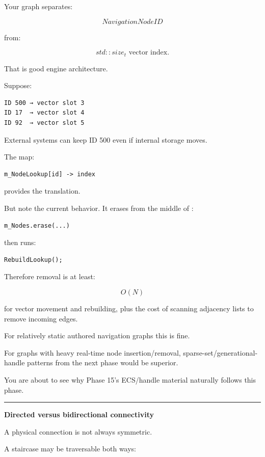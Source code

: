 Your graph separates:

\[
NavigationNodeID
\]

from:

\[
std::size_t\text{ vector index}.
\]

That is good engine architecture.

Suppose:

\begin{verbatim}
ID 500 → vector slot 3
ID 17  → vector slot 4
ID 92  → vector slot 5
\end{verbatim}

External systems can keep ID 500 even if internal storage moves.

The map:

\begin{verbatim}
m_NodeLookup[id] -> index
\end{verbatim}

provides the translation.

But note the current  behavior. It erases from the middle of :

\begin{verbatim}
m_Nodes.erase(...)
\end{verbatim}

then runs:

\begin{verbatim}
RebuildLookup();
\end{verbatim}

Therefore removal is at least:

\[
O(N)
\]

for vector movement and rebuilding, plus the cost of scanning adjacency lists to remove incoming edges.

For relatively static authored navigation graphs this is fine.

For graphs with heavy real-time node insertion/removal, sparse-set/generational-handle patterns from the next phase would be superior.

You are about to see why Phase 15's ECS/handle material naturally follows this phase.

\begin{center}\rule{0.5\linewidth}{0.5pt}\end{center}

\textbf{Directed versus bidirectional connectivity}

A physical connection is not always symmetric.

A staircase may be traversable both ways:

